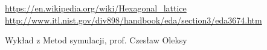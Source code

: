 \documentclass[]{scrartcl}
\begin{document}

\begin{thebibliography}{99}

	 \url{https://en.wikipedia.org/wiki/Hexagonal_lattice}
	 \label{1}		
	 	 \url{http://www.itl.nist.gov/div898/handbook/eda/section3/eda3674.htm} \label{2}
	 	
	 	 Wykład z Metod symulacji, prof. Czesław Oleksy \label{3}
\end{thebibliography}
\end{document}
